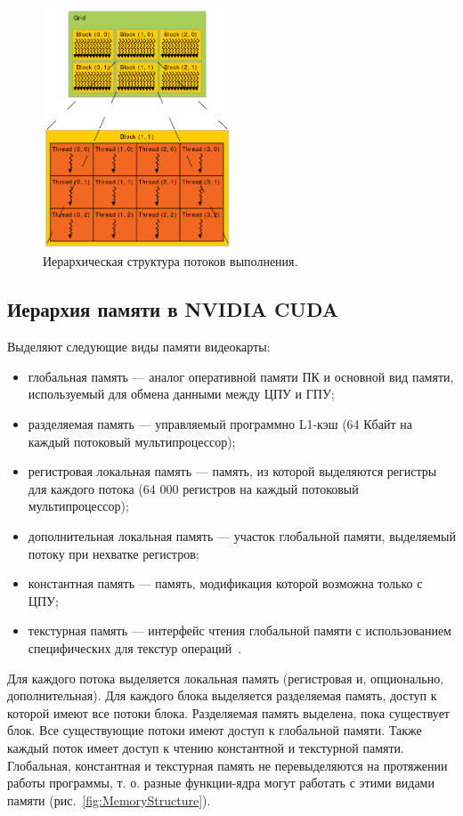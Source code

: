 \begin{figure}[p]
\centering
\includegraphics[width=0.5\textwidth]{include/graphics/image2}
\caption{Иерархическая структура потоков выполнения.}
\label{fig:ThreadsStructure}
\end{figure}

\subsection{Иерархия памяти в NVIDIA CUDA}

Выделяют следующие виды памяти видеокарты:
\begin{itemize}
\item глобальная память --- аналог оперативной памяти ПК и основной вид памяти, используемый для обмена данными между ЦПУ и ГПУ;
\item разделяемая память --- управляемый программно L1-кэш (64 Кбайт на
каждый потоковый мультипроцессор);
\item регистровая локальная память --- память, из которой выделяются регистры для каждого потока (64 000 регистров на каждый потоковый мультипроцессор);
\item дополнительная локальная память --- участок глобальной памяти, выделяемый потоку при нехватке регистров;
\item константная память --- память, модификация которой возможна только с ЦПУ;
\item текстурная память --- интерфейс чтения глобальной памяти с использованием специфических для текстур операций~\cite{CUDAToolkitDocumentation}.
\end{itemize}

Для каждого потока выделяется локальная память (регистровая и, опционально, дополнительная). Для каждого блока выделяется разделяемая память,
доступ к которой имеют все потоки блока. Разделяемая память выделена,
пока существует блок. Все существующие потоки имеют доступ к глобальной
памяти. Также каждый поток имеет доступ к чтению константной и текстурной
памяти. Глобальная, константная и текстурная память не перевыделяются на
протяжении работы программы, т. о. разные функции-ядра могут работать с
этими видами памяти (рис.~\ref{fig:MemoryStructure}).

